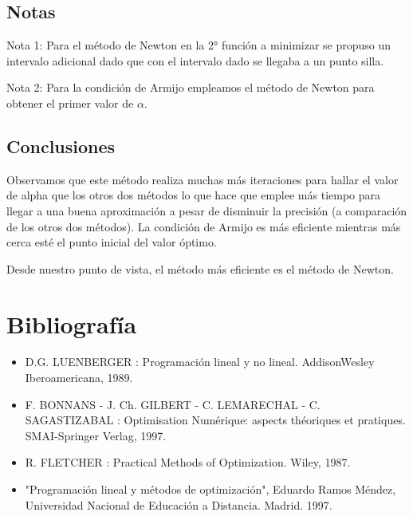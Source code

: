 \documentclass[12pt]{article}
\begin{document}
\vfill{}

\subsection*{Notas}

Nota 1: Para el método de Newton en la 2° función a minimizar se propuso un intervalo adicional dado que con el intervalo dado se llegaba a un punto silla.

Nota 2: Para la condición de Armijo empleamos el método de Newton para obtener el primer valor de $\alpha$. 

\newpage

\subsection*{Conclusiones}

Observamos que este método realiza muchas más iteraciones para hallar el valor de alpha que los otros dos métodos lo que hace que emplee más tiempo para llegar a una buena aproximación a pesar de disminuir la precisión (a comparación de los otros dos métodos). La condición de Armijo es más eficiente mientras más cerca esté el punto inicial del valor óptimo.

Desde nuestro punto de vista, el método más eficiente es el método de Newton.



\section*{Bibliografía}

\begin{itemize}
  \item D.G. LUENBERGER : Programación lineal y no lineal. AddisonWesley Iberoamericana, 1989.
  \item F. BONNANS - J. Ch. GILBERT - C. LEMARECHAL - C. SAGASTIZABAL : Optimisation Numérique: aspects théoriques et pratiques.
  SMAI-Springer Verlag, 1997.
  \item R. FLETCHER : Practical Methods of Optimization. Wiley, 1987.
  \item "Programación lineal y métodos de optimización", Eduardo Ramos Méndez, Universidad Nacional de Educación a Distancia. Madrid. 1997.
\end{itemize}

\end{document}
